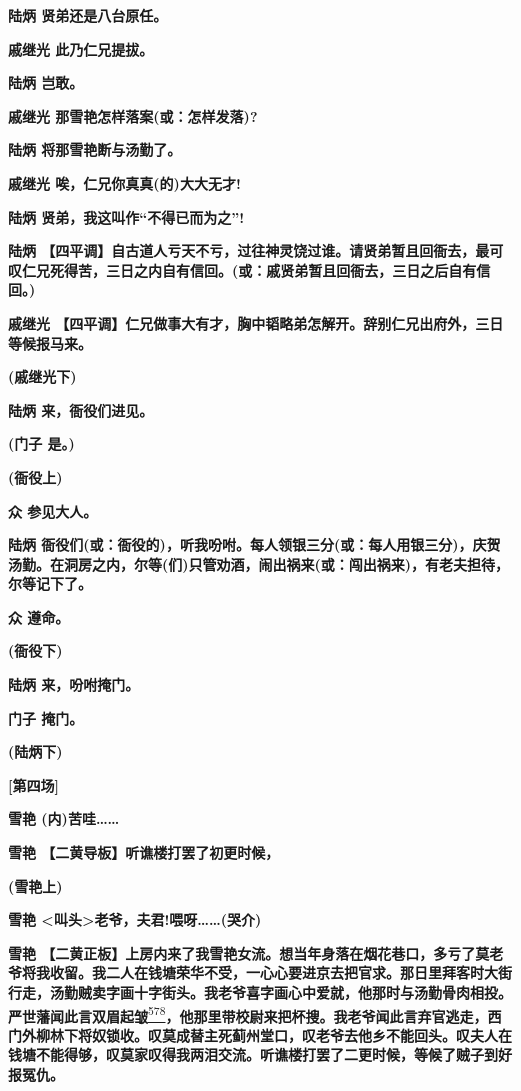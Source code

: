 \textbf{陆炳 贤弟还是八台原任。}

\textbf{戚继光 此乃仁兄提拔。}

\textbf{陆炳 岂敢。}

\textbf{戚继光 那雪艳怎样落案(或：怎样发落)?}

\textbf{陆炳 将那雪艳断与汤勤了。}

\textbf{戚继光 唉，仁兄你真真(的)大大无才!}

\textbf{陆炳 贤弟，我这叫作``不得已而为之''!}

\textbf{陆炳
【四平调】自古道人亏天不亏，过往神灵饶过谁。请贤弟暂且回衙去，最可叹仁兄死得苦，三日之内自有信回。(或：戚贤弟暂且回衙去，三日之后自有信回。)}

\textbf{戚继光
【四平调】仁兄做事大有才，胸中韬略弟怎解开。辞别仁兄出府外，三日等候报马来。}

\textbf{(戚继光下)}

\textbf{陆炳 来，衙役们进见。}

\textbf{(门子 是。)}

\textbf{(衙役上)}

\textbf{众 参见大人。}

\textbf{陆炳
衙役们(或：衙役的)，听我吩咐。每人领银三分(或：每人用银三分)，庆贺汤勤。在洞房之内，尔等(们)只管劝酒，闹出祸来(或：闯出祸来)，有老夫担待，尔等记下了。}

\textbf{众 遵命。}

\textbf{(衙役下)}

\textbf{陆炳 来，吩咐掩门。}

\textbf{门子 掩门。}

\textbf{(陆炳下)}

\textbf{{[}第四场{]}}

\textbf{雪艳 (内)苦哇\ldots{}\ldots{}}

\textbf{雪艳 【二黄导板】听谯楼打罢了初更时候，}

\textbf{(雪艳上)}

\textbf{雪艳
\textless{}叫头\textgreater{}老爷，夫君!喂呀\ldots{}\ldots{}(哭介)}

\textbf{雪艳
【二黄正板】上房内来了我雪艳女流。想当年身落在烟花巷口，多亏了莫老爷将我收留。我二人在钱塘荣华不受，一心心要进京去把官求。那日里拜客时大街行走，汤勤贼卖字画十字街头。我老爷喜字画心中爱就，他那时与汤勤骨肉相投。严世藩闻此言双眉起皱}\protect\hyperlink{fn578}{\textsuperscript{578}}\textbf{，他那里带校尉来把杯搜。我老爷闻此言弃官逃走，西门外柳林下将奴锁收。叹莫成替主死蓟州堂口，叹老爷去他乡不能回头。叹夫人在钱塘不能得够，叹莫家叹得我两泪交流。听谯楼打罢了二更时候，等候了贼子到好报冤仇。}

